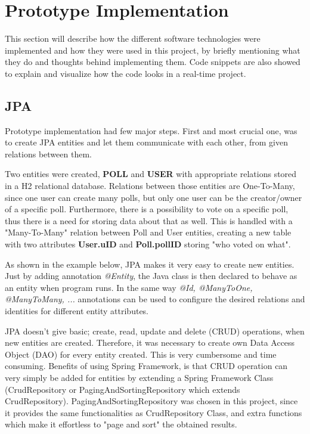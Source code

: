 \section{Prototype Implementation}
\label{sec:implementation}
This section will describe how the different software technologies were implemented and how they were used in this project, by briefly mentioning what they do and thoughts behind implementing them. Code snippets are also showed to explain and visualize how the code looks in a real-time project.

\subsection{JPA}\label{sub:jpa}
Prototype implementation had few major steps. First and most crucial one, was to create JPA entities and let them communicate with each other, from given relations between them.

Two entities were created, \textbf{POLL} and \textbf{USER} with appropriate relations stored in a H2 relational database. Relations between those entities are One-To-Many, since one user can create many polls, but only one user can be the creator/owner of a specific poll. Furthermore, there is a possibility to vote on a specific poll, thus there is a need for storing data about that as well. This is handled with a "Many-To-Many" relation between Poll and User entities, creating a new table with two attributes \textbf{User.uID} and \textbf{Poll.pollID} storing "who voted on what".

As shown in the example below, JPA makes it very easy to create new entities. Just by adding annotation \textit{@Entity}, the Java class is then declared to behave as an entity when program runs. In the same way \textit{@Id, @ManyToOne, @ManyToMany, ...} annotations can be used to configure the desired relations and identities for different entity attributes.\vspace{\baselineskip}
\vspace{\baselineskip}

JPA doesn't give basic; create, read, update and delete (CRUD) operations, when new entities are created. Therefore, it was necessary to create own Data Access Object (DAO) for every entity created. This is very cumbersome and time consuming. Benefits of using Spring Framework, is that CRUD operation can very simply be added for entities by extending a Spring Framework Class (CrudRepository or PagingAndSortingRepository which extends CrudRepository). PagingAndSortingRepository was chosen in this project, since it provides the same functionalities as CrudRepository Class, and extra functions which make it effortless to "page and sort" the obtained results.  

